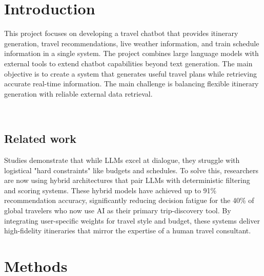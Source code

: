 \documentclass[fleqn,moreauthors,10pt]{ds_report}
\affiliation{\textit{Advisors: Aleš Žagar}}
\begin{document}
\flushbottom 

\maketitle 

\thispagestyle{empty} 


\section*{Introduction}

This project focuses on developing a travel chatbot that provides itinerary generation, travel recommendations, live weather information, and train schedule information in a single system. The project combines large language models with external tools to extend chatbot capabilities beyond text generation. The main objective is to create a system that generates useful travel plans while retrieving accurate real-time information. The main challenge is balancing flexible itinerary generation with reliable external data retrieval.

\

\subsection*{Related work}

Studies \cite{Elangovan2025, travalaManyTravelers, karlovic2025context} demonstrate that while LLMs excel at dialogue, they struggle with logistical "hard constraints" like budgets and schedules. To solve this, researchers are now using hybrid architectures that pair LLMs with deterministic filtering and scoring systems. These hybrid models have achieved up to 91\% recommendation accuracy, significantly reducing decision fatigue for the 40\% of global travelers who now use AI as their primary trip-discovery tool. By integrating user-specific weights for travel style and budget, these systems deliver high-fidelity itineraries that mirror the expertise of a human travel consultant.


\section*{Methods}
\end{document}
